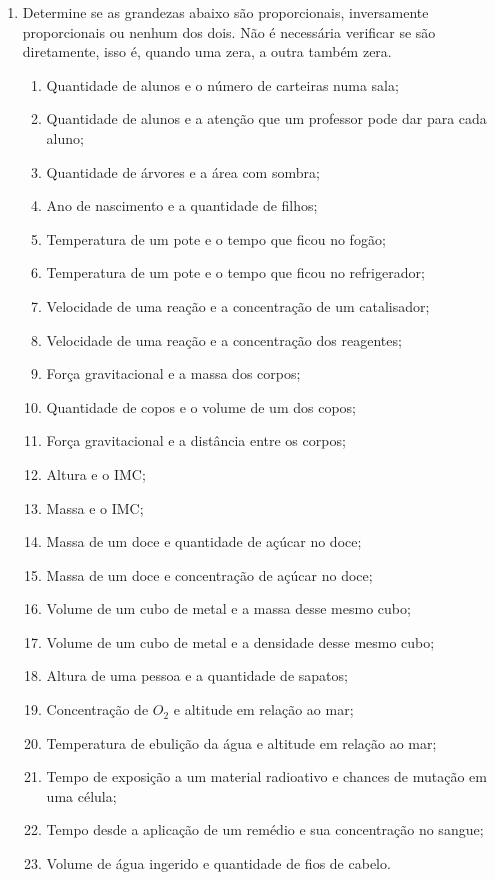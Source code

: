 \documentclass[12pt]{report}
\newcommand{\1}{\faThermometerEmpty}
\newcommand{\2}{\faThermometerQuarter}
\newcommand{\3}{\faThermometerHalf}
\newcommand{\4}{\faThermometerThreeQuarters}
\newcommand{\5}{\faThermometerFull}
\begin{document}
\vspace{5mm}

\begin{enumerate}
\item Determine se as grandezas abaixo são proporcionais, inversamente proporcionais ou nenhum dos dois. Não é necessária verificar se são diretamente, isso é, quando uma zera, a outra também zera. \1

\begin{enumerate}
    \item Quantidade de alunos e o número de carteiras numa sala;
    \item Quantidade de alunos e a atenção que um professor pode dar para cada aluno;
    \item Quantidade de árvores e a área com sombra;
    \item Ano de nascimento e a quantidade de filhos;
    \item Temperatura de um pote e o tempo que ficou no fogão;
    \item Temperatura de um pote e o tempo que ficou no refrigerador;
    \item Velocidade de uma reação e a concentração de um catalisador;
    \item Velocidade de uma reação e a concentração dos reagentes;
    \item Força gravitacional e a massa dos corpos;
    \item Quantidade de copos e o volume de um dos copos;
    \item Força gravitacional e a distância entre os corpos;
    \item Altura e o IMC;
    \item Massa e o IMC;
    \item Massa de um doce e quantidade de açúcar no doce;
    \item Massa de um doce e concentração de açúcar no doce;
    \item Volume de um cubo de metal e a massa desse mesmo cubo;
    \item Volume de um cubo de metal e a densidade desse mesmo cubo;
    \item Altura de uma pessoa e a quantidade de sapatos;
    \item Concentração de $O_2$ e altitude em relação ao mar;
    \item Temperatura de ebulição da água e altitude em relação ao mar;
    \item Tempo de exposição a um material radioativo e chances de mutação em uma célula;
    \item Tempo desde a aplicação de um remédio e sua concentração no sangue;
    \item Volume de água ingerido e quantidade de fios de cabelo.
    \end{enumerate}



\end{enumerate}
\end{document}
